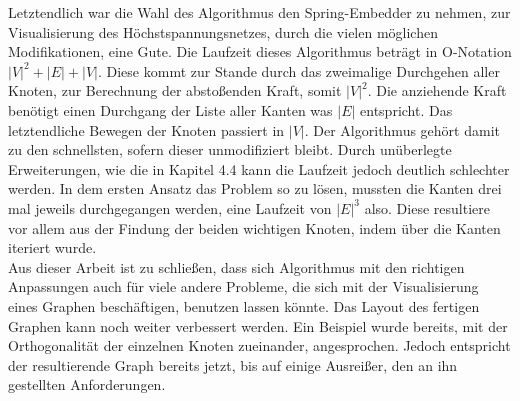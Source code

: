 Letztendlich war die Wahl des Algorithmus den Spring-Embedder zu nehmen, zur Visualisierung des Höchstspannungsnetzes, durch die vielen möglichen Modifikationen, eine Gute. Die Laufzeit dieses Algorithmus beträgt in O-Notation $|V|^{2} + |E| + |V|$. Diese kommt zur Stande durch das zweimalige Durchgehen aller Knoten, zur Berechnung der abstoßenden Kraft, somit $|V|^{2}$. Die anziehende Kraft benötigt einen Durchgang der Liste aller Kanten was $|E|$ entspricht. Das letztendliche Bewegen der Knoten passiert in $|V|$. Der Algorithmus gehört damit zu den schnellsten, sofern dieser unmodifiziert bleibt. Durch unüberlegte Erweiterungen, wie die in Kapitel 4.4 kann die Laufzeit jedoch deutlich schlechter werden. In dem ersten Ansatz das Problem so zu lösen, mussten die Kanten drei mal jeweils durchgegangen werden, eine Laufzeit von $|E|^{3}$ also. Diese resultiere vor allem aus der Findung der beiden wichtigen Knoten, indem über die Kanten iteriert wurde. \\

Aus dieser Arbeit ist zu schließen, dass sich Algorithmus mit den richtigen Anpassungen auch für viele andere Probleme, die sich mit der Visualisierung eines Graphen beschäftigen, benutzen lassen könnte. Das Layout des fertigen Graphen kann noch weiter verbessert werden. Ein Beispiel wurde bereits, mit der Orthogonalität der einzelnen Knoten zueinander, angesprochen. Jedoch entspricht der resultierende Graph bereits jetzt, bis auf einige Ausreißer, den an ihn gestellten Anforderungen. 


